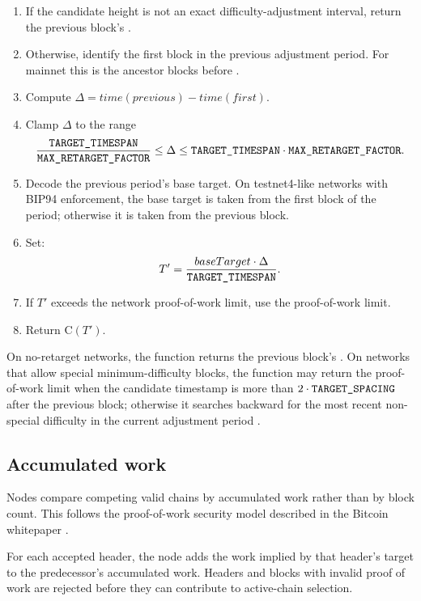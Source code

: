 \begin{enumerate}[leftmargin=*]
  \item If the candidate height is not an exact difficulty-adjustment interval,
        return the previous block's .
  \item Otherwise, identify the first block in the previous adjustment period.
        For mainnet this is the ancestor
         blocks before
        .
  \item Compute
        $\Delta = time(previous) - time(first)$.
  \item Clamp $\Delta$ to the range
        \[
          \frac{\text{\texttt{TARGET\_TIMESPAN}}}{\text{\texttt{MAX\_RETARGET\_FACTOR}}}
          \le \Delta \le
          \text{\texttt{TARGET\_TIMESPAN}} \cdot
          \text{\texttt{MAX\_RETARGET\_FACTOR}}.
        \]
  \item Decode the previous period's base target. On testnet4-like networks with
        BIP94 enforcement, the base target is taken from the first block of the
        period; otherwise it is taken from the previous block.
  \item Set:
        \[
          T' =
          \frac{baseTarget \cdot \Delta}{\text{\texttt{TARGET\_TIMESPAN}}}.
        \]
  \item If $T'$ exceeds the network proof-of-work limit, use the proof-of-work
        limit.
  \item Return \(\mathrm{C}(T')\).
\end{enumerate}

On no-retarget networks, the function returns the previous block's
. On networks that allow special minimum-difficulty blocks, the
function may return the proof-of-work limit when the candidate timestamp is more
than \(2 \cdot \text{\texttt{TARGET\_SPACING}}\) after the previous block;
otherwise it searches backward for the most recent non-special difficulty in the
current adjustment period \cite{bitcoin-core-v31}.

\subsection{Accumulated work}

Nodes compare competing valid chains by accumulated work rather than by block
count. This follows the proof-of-work security model described in the Bitcoin
whitepaper \cite{nakamoto-bitcoin}.

For each accepted header, the node adds the work implied by that header's target
to the predecessor's accumulated work. Headers and blocks with invalid proof of
work are rejected before they can contribute to active-chain selection.

